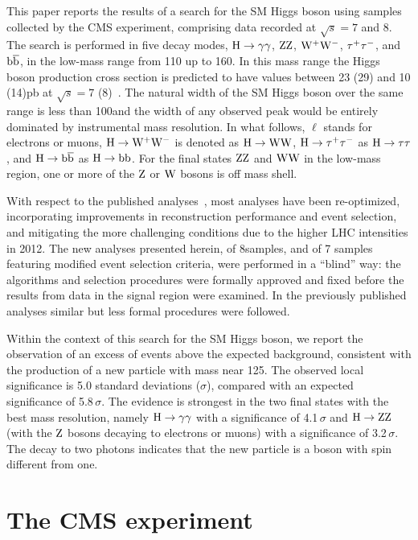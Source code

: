 \documentclass[11pt,twoside,a4paper,cmspaper,final]{cms-tdr}
\begin{document}
This paper reports the results of a search for the SM Higgs boson using samples collected by
the CMS experiment, comprising data recorded at $\sqrt{s}=7$ and 8\TeV. The search is
performed in five decay modes,
$\mathrm{H}\to\gamma\gamma$, $\mathrm{Z}\mathrm{Z}$, $\mathrm{W^+}\mathrm{W^-}$, $\tau^+\tau^-$, and
$\mathrm{b}\overline{\mathrm{b}}$, in the low-mass range from 110 up to 160\GeV.
In this mass range the Higgs boson production cross section is predicted to have values between 23
(29) and 10 (14)\unit{pb} at $\sqrt{s}=7$ (8)\TeV~\cite{LHCHiggsCrossSectionWorkingGroup:2011ti}.
The natural width of the SM Higgs boson over the same
range is less than 100\MeV and the width of any observed peak would be entirely dominated by instrumental mass
resolution.
In what follows, $\ell$ stands for electrons or muons, $\mathrm{H}\to\mathrm{W^+}\mathrm{W^-}$ is denoted as $\mathrm{H}\to\mathrm{W}\mathrm{W}$, $\mathrm{H} \to \tau^+\tau^-$ as
$\mathrm{H} \to \tau\tau$, and $\mathrm{H} \to \mathrm{b}\overline{\mathrm{b}}$ as $\mathrm{H} \to \mathrm{b}\mathrm{b}$.
For the final states $\mathrm{Z}\mathrm{Z}$ and $\mathrm{W}\mathrm{W}$ in the low-mass region, one or more of the $\mathrm{Z}$ or $\mathrm{W}$
bosons is off mass shell.

With respect to the published
analyses~\cite{Chatrchyan:2012tw,Chatrchyan:2012dg,Chatrchyan:2012ty,Chatrchyan:2012vp,Chatrchyan:2012ww},
most analyses have been re-optimized,
incorporating improvements in reconstruction performance and event
selection, and mitigating the more challenging conditions due to
the higher LHC intensities in 2012.
The new analyses presented herein, of 8\TeV samples, and of 7\TeV
samples featuring modified event selection criteria, were performed in a ``blind'' way:
the algorithms and selection procedures were formally approved and
fixed before the results from data in the signal region were examined.
In the previously published analyses similar but less formal procedures were followed.

Within the context of this search for the SM Higgs boson, we report the observation of an excess of
events above the expected background, consistent with the production
of a new particle with
mass near 125\GeV. The observed local significance is 5.0 standard deviations ($\sigma$), compared
with an expected significance of 5.8\,$\sigma$. The evidence is
strongest in the two final states with the best mass
resolution, namely $\mathrm{H}\to\gamma\gamma$ with a significance of 4.1\,$\sigma$ and $\mathrm{H}\to\mathrm{Z}\mathrm{Z}$ (with the
$\mathrm{Z}$ bosons decaying to electrons or muons) with a significance of 3.2\,$\sigma$. The decay to two photons indicates that the new particle is a boson with spin different from one.

\section{The CMS experiment}\label{sec:Apparatus}
\end{document}
